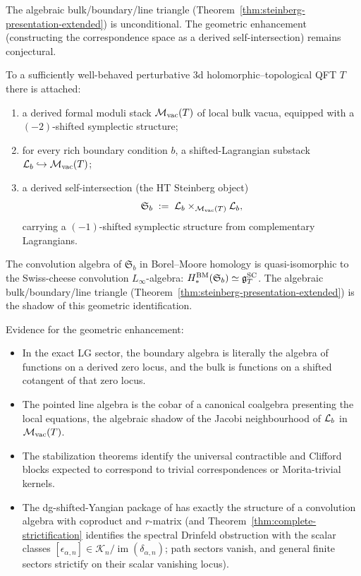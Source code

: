 The algebraic bulk/boundary/line triangle
(Theorem~\ref{thm:steinberg-presentation-extended}) is unconditional.
The geometric enhancement (constructing the correspondence space
as a derived self-intersection) remains conjectural.

\begin{conjecture}
\label{conj:geometric-steinberg}
To a sufficiently well-behaved perturbative 3d
holomorphic--topological QFT $T$ there is attached:
\begin{enumerate}[label=\textup{(\alph*)}]
\item a derived formal moduli stack $\mathcal M_{\mathrm{vac}}(T)$ of
 local bulk vacua, equipped with a $(-2)$-shifted symplectic
 structure;
\item for every rich boundary condition $b$, a shifted-Lagrangian
 substack $\mathcal L_b \hookrightarrow \mathcal M_{\mathrm{vac}}(T)$;
\item a derived self-intersection (the HT Steinberg object)
 \[
 \mathfrak S_b
 \;:=\;
 \mathcal L_b \times_{\mathcal M_{\mathrm{vac}}(T)} \mathcal L_b,
 \]
 carrying a $(-1)$-shifted symplectic structure from
 complementary Lagrangians.
\end{enumerate}
The convolution algebra of $\mathfrak S_b$ in Borel--Moore homology
is quasi-isomorphic to the Swiss-cheese convolution $L_\infty$-algebra:
$H_*^{\mathrm{BM}}(\mathfrak S_b) \simeq \mathfrak{g}^{\mathrm{SC}}_T$.
The algebraic bulk/boundary/line triangle
\textup{(}Theorem~\textup{\ref{thm:steinberg-presentation-extended}}\textup{)}
is the shadow of this geometric identification.
\end{conjecture}

Evidence for the geometric enhancement:
\begin{itemize}[leftmargin=1.8em]
\item In the exact LG sector, the boundary algebra is literally
 the algebra of functions on a derived zero locus, and the bulk
 is functions on a shifted cotangent of that zero locus.
\item The pointed line algebra is the cobar of a canonical coalgebra
 presenting the local equations, the algebraic shadow of the
 Jacobi neighbourhood of $\mathcal L_b$ in $\mathcal M_{\mathrm{vac}}(T)$.
\item The stabilization theorems identify the universal contractible
 and Clifford blocks expected to correspond to trivial
 correspondences or Morita-trivial kernels.
\item The dg-shifted-Yangian package of \cite{DNP25} has exactly
 the structure of a convolution algebra with coproduct and
 $r$-matrix
 (and Theorem~\ref{thm:complete-strictification} identifies the
 spectral Drinfeld obstruction with the scalar classes
 $[\epsilon_{\alpha,n}]\in
 \mathscr K_n/\operatorname{im}(\delta_{\alpha,n})$; path sectors
 vanish, and general finite sectors strictify on their scalar
 vanishing locus).
\end{itemize}

